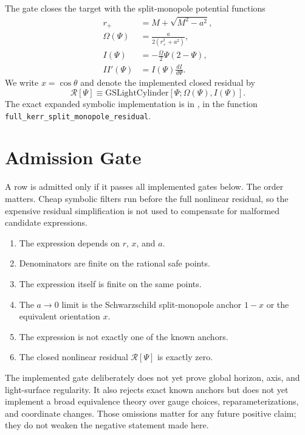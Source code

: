 \documentclass[11pt]{article}
\newcommand{\Residual}{\ensuremath{\mathcal{R}}}
\begin{document}
The gate closes the target with the split-monopole potential functions
\begin{align}
  r_+ &= M+\sqrt{M^2-a^2},\\
  \Omega(\Psi) &= \frac{a}{2(r_+^2+a^2)},\\
  I(\Psi) &= -\frac{\Omega}{2}\Psi(2-\Psi),\\
  II'(\Psi) &= I(\Psi)\frac{dI}{d\Psi}.
\end{align}
We write $x=\cos\theta$ and denote the implemented closed residual by
\begin{equation}
  \Residual[\Psi]\equiv
  \mathrm{GSLightCylinder}\!\left[\Psi;\Omega(\Psi),I(\Psi)\right].
\end{equation}
The exact expanded symbolic implementation is in
, in the function
\texttt{full\_\allowbreak kerr\_\allowbreak split\_\allowbreak monopole\_\allowbreak residual}.

\section{Admission Gate}

A row is admitted only if it passes all implemented gates below.  The order
matters.  Cheap symbolic filters run before the full nonlinear residual, so the
expensive residual simplification is not used to compensate for malformed
candidate expressions.

\begin{enumerate}
  \item The expression depends on $r$, $x$, and $a$.
  \item Denominators are finite on the rational safe points.
  \item The expression itself is finite on the same points.
  \item The $a\to 0$ limit is the Schwarzschild split-monopole anchor $1-x$ or
        the equivalent orientation $x$.
  \item The expression is not exactly one of the known anchors.
  \item The closed nonlinear residual $\Residual[\Psi]$ is exactly zero.
\end{enumerate}

The implemented gate deliberately does not yet prove global horizon,
axis, and light-surface regularity.  It also rejects exact known anchors but
does not yet implement a broad equivalence theory over gauge choices,
reparameterizations, and coordinate changes.  Those omissions matter for any
future positive claim; they do not weaken the negative statement made here.
\end{document}
